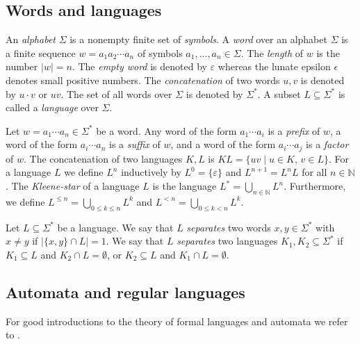 \documentclass{article}\usepackage[a4paper,margin=20mm]{geometry}
\newcommand{\N}{\mathbb{N}}
\newcommand{\eps}{\varepsilon}
\renewcommand{\leq}{\leqslant}
\renewcommand{\le}{\leq}
\begin{document}
\label{chap:prelim}

\subsection{Words and languages}

An {\em alphabet} $\Sigma$ is a nonempty finite set of {\em symbols}.
A {\em word} over an alphabet $\Sigma$ is a finite sequence
$w = a_1 a_2 \cdots a_n$ of symbols $a_1, \dots, a_n \in \Sigma$.
The {\em length} of $w$ is the number $|w| = n$. 
The {\em empty word} is denoted by $\eps$
whereas the lunate epsilon $\epsilon$ denotes small positive numbers.
The {\em concatenation} of two words $u,v$ is denoted by $u \cdot v$ or $uv$.
The set of all words over $\Sigma$ is denoted by $\Sigma^*$.
A subset $L \subseteq \Sigma^*$ is called a {\em language} over $\Sigma$.

Let $w = a_1 \cdots a_n \in \Sigma^*$ be a word.
Any word of the form $a_1 \cdots a_i$ is a {\em prefix} of $w$,
a word of the form $a_i \cdots a_n$ is a {\em suffix} of $w$,
and a word of the form $a_i \cdots a_j$ is a {\em factor} of $w$.
The concatenation of two languages $K,L$ is $KL = \{ uv \mid u \in K, \, v \in L \}$.
For a language $L$ we define $L^n$ inductively by $L^0 = \{\varepsilon\}$
and $L^{n+1} = L^n L$ for all $n \in \N$.
The {\em Kleene-star} of a language $L$ is the language $L^* = \bigcup_{n \in \N} L^n$.
Furthermore, we define $L^{\le n} = \bigcup_{0 \le k \le n} L^k$
and $L^{< n} = \bigcup_{0 \le k < n} L^k$.

Let $L \subseteq \Sigma^*$ be a language.
We say that $L$ {\em separates} two words $x,y \in \Sigma^*$ with $x \neq y$ if
$|\{x,y\} \cap L| = 1$.
We say that $L$ {\em separates} two languages $K_1,K_2 \subseteq \Sigma^*$ if
$K_1 \subseteq L$ and $K_2 \cap L = \emptyset$, or
$K_2 \subseteq L$ and $K_1 \cap L = \emptyset$.


\subsection{Automata and regular languages} \label{sec-automata}

For good introductions to the theory of formal languages and automata we refer to \cite{Berstel79,HopcroftU79,Kozen97}.
\end{document}
